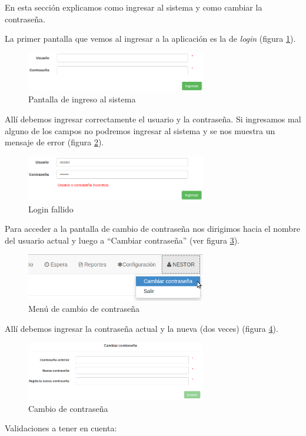 En esta sección explicamos como ingresar al sistema y como cambiar la contraseña.

La primer pantalla que vemos al ingresar a la aplicación es la de \textit{login} (figura \ref{fig:login}).
\begin{figure}[h]
\centerline{\includegraphics[width=0.7\textwidth]{login.png}}
\caption{Pantalla de ingreso al sistema}
\label{fig:login}
\end{figure}
Allí debemos ingresar correctamente el usuario y la contraseña. Si ingresamos mal alguno de los campos no podremos ingresar al sistema y se nos muestra un mensaje de error (figura \ref{fig:login_fallido}).
\begin{figure}
\centerline{\includegraphics[width=0.7\textwidth]{login_fallido.png}}
\caption{Login fallido}
\label{fig:login_fallido}
\end{figure}

\label{cap:cambio_pass}
Para acceder a la pantalla de cambio de contraseña nos dirigimos hacia el nombre del usuario actual y luego a ``Cambiar contraseña'' (ver figura \ref{fig:menu_cambio_pass}).
\begin{figure}
\centerline{\includegraphics[width=0.7\textwidth]{menu_cambio_pass.png}}
\caption{Menú de cambio de contraseña}
\label{fig:menu_cambio_pass}
\end{figure}
Allí debemos ingresar la contraseña actual y la nueva (dos veces) (figura \ref{fig:cambio_pass}).
\begin{figure}
\centerline{\includegraphics[width=0.7\textwidth]{cambio_pass.png}}
\caption{Cambio de contraseña}
\label{fig:cambio_pass}
\end{figure}
Validaciones a tener en cuenta:

